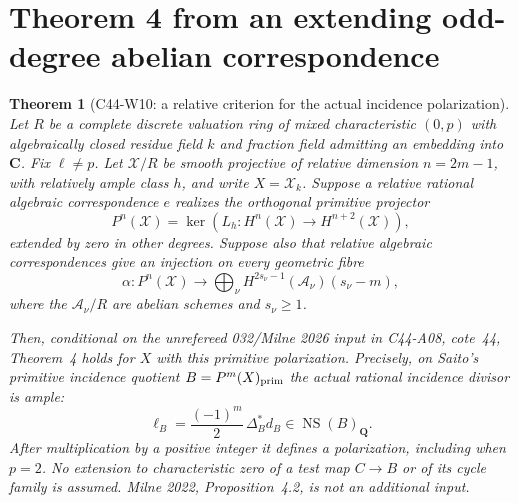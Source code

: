 \documentclass[11pt]{article}
\newtheorem{theorem}{Theorem}[section]
\theoremstyle{remark}\newtheorem{remark}[theorem]{Remark}
\begin{document}

\section{Theorem 4 from an extending odd-degree abelian correspondence}

\begin{theorem}[C44-W10: a relative criterion for the actual incidence polarization]
Let $R$ be a complete discrete valuation ring of mixed characteristic
$(0,p)$ with algebraically closed residue field $k$ and fraction field
admitting an embedding into $\mathbf C$. Fix $\ell\ne p$.
Let $\mathscr X/R$ be smooth projective of relative dimension
$n=2m-1$, with relatively ample class $h$, and write $X=\mathscr X_k$.
Suppose a relative rational algebraic correspondence $e$ realizes the
orthogonal primitive projector
\[
 P^n(\mathscr X)=\ker(L_h:H^n(\mathscr X)\longrightarrow
                                      H^{n+2}(\mathscr X)),
 \tag{C44.W10.1}
\]
extended by zero in other degrees. Suppose also that relative
algebraic correspondences give an injection on every geometric fibre
\[
 \alpha:P^n(\mathscr X)\longrightarrow
       \bigoplus_\nu H^{2s_\nu-1}(\mathscr A_\nu)(s_\nu-m),
 \tag{C44.W10.2}
\]
where the $\mathscr A_\nu/R$ are abelian schemes and $s_\nu\geq1$.

Then, conditional on the unrefereed 032/Milne 2026 input in C44-A08,
cote~44, Theorem~4 holds for $X$ with this primitive polarization.
Precisely, on Saito's primitive incidence quotient
$B=P^m(X)_{\rm prim}$ the actual rational incidence divisor is ample:
\[
       \ell_B=\frac{(-1)^m}{2}\,\Delta_B^*d_B
                  \in\operatorname{NS}(B)_{\mathbf Q}.
 \tag{C44.W10.3}
\]
After multiplication by a positive integer it defines a polarization,
including when $p=2$. No extension to characteristic zero of a test
map $C\to B$ or of its cycle family is assumed. Milne 2022,
Proposition~4.2, is not an additional input.
\end{theorem}
\end{document}
